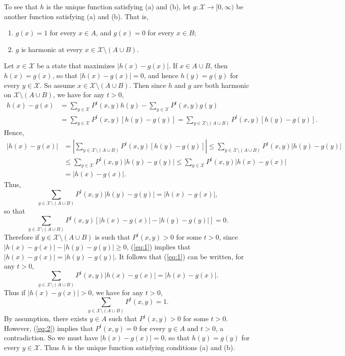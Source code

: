\documentclass[12pt]{article}
\begin{document}
To see that $h$ is the unique function satisfying (a) and (b), let $g : \mathcal{X} \to [0, \infty)$ be another function satisfying (a) and (b). That is,
\begin{enumerate}[label=(\alph*)]
\item
$g(x) = 1$ for every $x \in A$, and $g(x) = 0$ for every $x \in B$;

\item
$g$ is harmonic at every $x \in \mathcal{X} \setminus (A \cup B)$.
\end{enumerate}
Let $x \in \mathcal{X}$ be a state that maximizes $|h(x) - g(x)|$. If $x \in A \cup B$, then $h(x) = g(x)$, so that $|h(x) - g(x)| = 0$, and hence $h(y) = g(y)$ for every $y \in \mathcal{X}$. So assume $x \in \mathcal{X} \setminus (A \cup B)$. Then since $h$ and $g$ are both harmonic on $\mathcal{X} \setminus (A \cup B)$, we have for any $t > 0$,
\begin{align*}
h(x) - g(x) &= \sum_{y \in \mathcal{X}} P^t(x, y)h(y) - \sum_{y \in \mathcal{X}} P^t(x, y)g(y) \\
&= \sum_{y \in \mathcal{X}} P^t(x, y)[h(y) - g(y)] = \sum_{y \in \mathcal{X} \setminus (A \cup B)} P^t(x, y)[h(y) - g(y)].
\end{align*}
Hence,
\begin{align*}
|h(x) - g(x)| &= \left|\sum_{y \in \mathcal{X} \setminus (A \cup B)} P^t(x, y)[h(y) - g(y)]\right| \leq \sum_{y \in \mathcal{X} \setminus (A \cup B)} P^t(x, y) |h(y) - g(y)| \\
&\leq \sum_{y \in \mathcal{X}} P^t(x, y) |h(y) - g(y)| \leq \sum_{y \in \mathcal{X}} P^t(x, y) |h(x) - g(x)| \\
&= |h(x) - g(x)|.
\end{align*}
Thus,
\begin{equation*}
\sum_{y \in \mathcal{X} \setminus (A \cup B)} P^t(x, y) |h(y) - g(y)| = |h(x) - g(x)|,
\end{equation*}
so that
\begin{equation} \label{eq:1}
\sum_{y \in \mathcal{X} \setminus (A \cup B)} P^t(x, y) [|h(x) - g(x)| - |h(y) - g(y)|] = 0.
\end{equation}
Therefore if $y \in \mathcal{X} \setminus (A \cup B)$ is such that $P^t(x, y) > 0$ for some $t > 0$, since $|h(x) - g(x)| - |h(y) - g(y)| \geq 0$, (\ref{eq:1}) implies that $|h(x) - g(x)| = |h(y) - g(y)|$. It follows that (\ref{eq:1}) can be written, for any $t > 0$,
\begin{equation*}
\sum_{y \in \mathcal{X} \setminus (A \cup B)} P^t(x, y) |h(x) - g(x)| = |h(x) - g(x)|.
\end{equation*}
Thus if $|h(x) - g(x)| > 0$, we have for any $t > 0$,
\begin{equation} \label{eq:2}
\sum_{y \in \mathcal{X} \setminus (A \cup B)} P^t(x, y) = 1.
\end{equation}
By assumption, there exists $y \in A$ such that $P^t(x, y) > 0$ for some $t > 0$. However, (\ref{eq:2}) implies that $P^t(x, y) = 0$ for every $y \in A$ and $t > 0$, a contradiction. So we must have $|h(x) - g(x)| = 0$, so that $h(y) = g(y)$ for every $y \in \mathcal{X}$. Thus $h$ is the unique function satisfying conditions (a) and (b).
\end{document}
